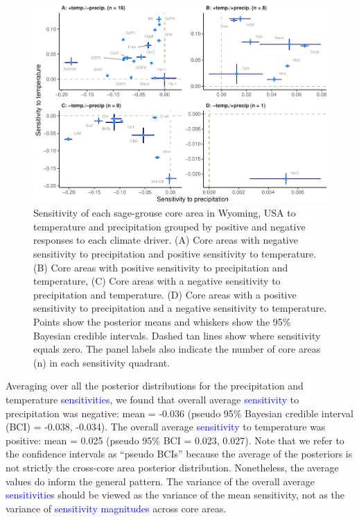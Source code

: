 \documentclass[
  12pt,
]{article}
\begin{document}
\begin{figure}
\centering
\includegraphics{sageCastManuscript_files/figure-latex/sen-scatter-1.pdf}
\caption{\label{fig:sen-scatter}Sensitivity of each sage-grouse core area in Wyoming, USA to temperature and precipitation grouped by positive and negative responses to each climate driver. (A) Core areas with negative sensitivity to precipitation and positive sensitivity to temperature. (B) Core areas with positive sensitivity to precipitation and temperature, (C) Core areas with a negative sensitivity to precipitation and temperature. (D) Core areas with a positive sensitivity to precipitation and a negative sensitivity to temperature. Points show the posterior means and whiskers show the 95\% Bayesian credible intervals. Dashed tan lines show where sensitivity equals zero. The panel labels also indicate the number of core areas (n) in each sensitivity quadrant.}
\end{figure}

Averaging over all the posterior distributions for the precipitation and temperature \textcolor{blue}{sensitivities}, we found that overall average \textcolor{blue}{sensitivity} to precipitation was negative: mean = -0.036 (pseudo 95\% Bayesian credible interval (BCI) = -0.038, -0.034).
The overall average \textcolor{blue}{sensitivity} to temperature was positive: mean = 0.025 (pseudo 95\% BCI = 0.023, 0.027).
Note that we refer to the confidence intervals as ``pseudo BCIs'' because the average of the posteriors is not strictly the cross-core area posterior distribution.
Nonetheless, the average values do inform the general pattern.
The variance of the overall average \textcolor{blue}{sensitivities} should be viewed as the variance of the mean sensitivity, not as the variance of \textcolor{blue}{sensitivity magnitudes} across core areas.
\end{document}
